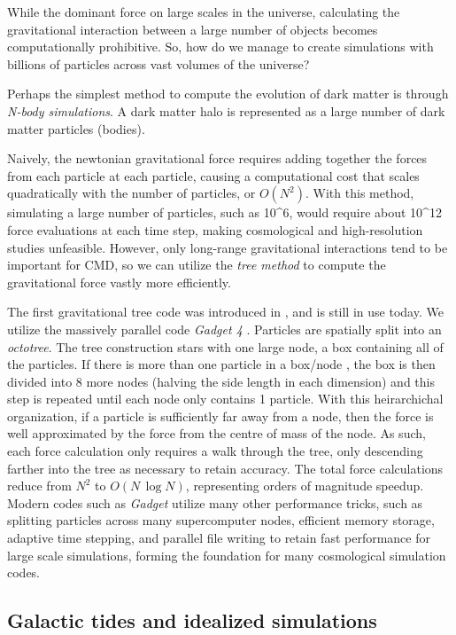 While the dominant force on large scales in the universe, calculating
the gravitational interaction between a large number of objects becomes
computationally prohibitive. So, how do we manage to create simulations
with billions of particles across vast volumes of the universe?

Perhaps the simplest method to compute the evolution of dark matter is
through \emph{N-body simulations}. A dark matter halo is represented as
a large number of dark matter particles (bodies).

Naively, the newtonian gravitational force requires adding together the
forces from each particle at each particle, causing a computational cost
that scales quadratically with the number of particles, or \(O(N^2)\).
With this method, simulating a large number of particles, such as
10\^{}6, would require about 10\^{}12 force evaluations at each time
step, making cosmological and high-resolution studies unfeasible.
However, only long-range gravitational interactions tend to be important
for CMD, so we can utilize the \emph{tree method} to compute the
gravitational force vastly more efficiently.

The first gravitational tree code was introduced in
\citet{barnes+hut1986}, and is still in use today. We utilize the
massively parallel code \emph{Gadget 4} \citep{gadget4}. Particles are
spatially split into an \emph{octotree}. The tree construction stars
with one large node, a box containing all of the particles. If there is
more than one particle in a box/node , the box is then divided into 8
more nodes (halving the side length in each dimension) and this step is
repeated until each node only contains 1 particle. With this
heirarchichal organization, if a particle is sufficiently far away from
a node, then the force is well approximated by the force from the centre
of mass of the node. As such, each force calculation only requires a
walk through the tree, only descending farther into the tree as
necessary to retain accuracy. The total force calculations reduce from
\(N^2\) to \(O(N\,\log N)\), representing orders of magnitude speedup.
Modern codes such as \emph{Gadget} utilize many other performance
tricks, such as splitting particles across many supercomputer nodes,
efficient memory storage, adaptive time stepping, and parallel file
writing to retain fast performance for large scale simulations, forming
the foundation for many cosmological simulation codes.

\subsection{Galactic tides and idealized
simulations}\label{galactic-tides-and-idealized-simulations}

